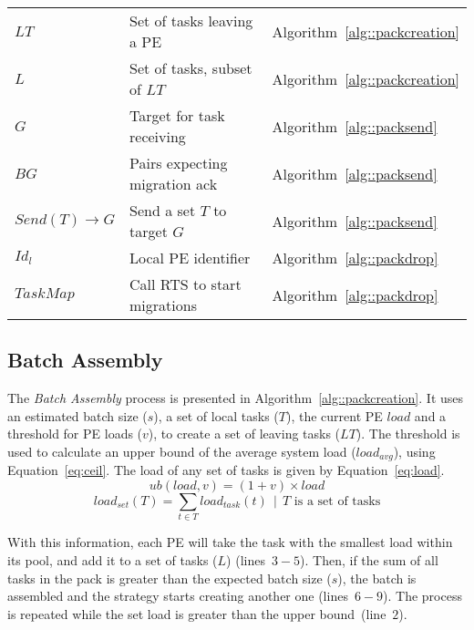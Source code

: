 \begin{table}[t]
\begin{tabular}{l | l | l }
		$LT$				& Set of tasks leaving a PE 							& Algorithm~\ref{alg::packcreation} \\
		$L$				& Set of tasks, subset of $LT$						& Algorithm~\ref{alg::packcreation} \\
		$G$				& Target for task receiving							& Algorithm~\ref{alg::packsend} \\
		$BG$				& Pairs expecting migration ack						& Algorithm~\ref{alg::packsend} \\ 
		$Send(T)\rightarrow G $ & Send a set $T$ to target $G$				& Algorithm~\ref{alg::packsend} \\ 
		$Id_l$ 			& Local PE identifier								& Algorithm~\ref{alg::packdrop} \\
		$TaskMap$		& Call RTS to start migrations						& Algorithm~\ref{alg::packdrop} \\
		
	\end{tabular}
	\label{tab:algo:symbols}
\end{table}

\subsection{Batch Assembly} \label{sec:algo:creation}

The \textit{Batch Assembly} process is presented in Algorithm~\ref{alg::packcreation}.
It uses an estimated batch size ($s$), a set of local tasks ($T$), the current PE $load$ and a threshold for PE loads ($v$), to create a set of leaving tasks ($LT$).
The threshold is used to calculate an upper bound of the average system load ($load_{avg}$), using Equation~\ref{eq:ceil}. 
The load of any set of tasks is given by Equation~\ref{eq:load}.
\begin{equation}
	ub(load,v) = (1+v)\times load
    \label{eq:ceil}
\end{equation}
\begin{equation}
	load_{set}(T) = \sum_{t \in T}{load_{task}(t)}\ \ |\ \ T \text{ is a set of tasks}
	\label{eq:load}
\end{equation}

With this information, each PE will take the task with the smallest load within its pool, and add it to a set of tasks ($L$) (lines~$3-5$).
Then, if the sum of all tasks in the pack is greater than the expected batch size ($s$), the batch is assembled and the strategy starts creating another one (lines~$6-9$).
The process is repeated while the set load is greater than the upper bound~(line~$2$).

